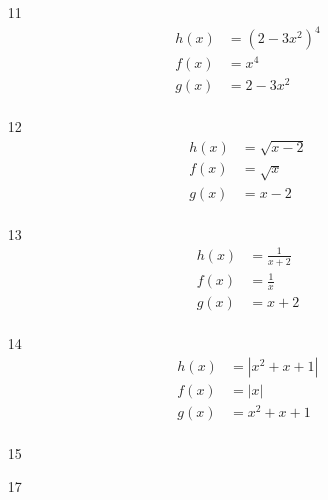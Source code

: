 \documentclass[fleqn,addpoints]{exam}
\begin{document}
\begin{itemize}
\item[11]
\begin{align*}
  h(x) &= (2-3x^2)^4 \\
  f(x) &= x^4 \\
  g(x) &= 2-3x^2 \\
\end{align*}

\item[12]
\begin{align*}
  h(x) &= \sqrt{x-2} \\
  f(x) &= \sqrt{x} \\
  g(x) &= x-2 \\
\end{align*}

\item[13]
\begin{align*}
  h(x) &=  \frac{1}{x+2}\\
  f(x) &=  \frac{1}{x}\\
  g(x) &= x+2 \\
\end{align*}

\item[14]
\begin{align*}
  h(x) &=  |x^2+x+1|\\
  f(x) &=  |x|\\
  g(x) &= x^2+x+1\\
\end{align*}

\item[15]

\item[17]


\end{itemize}
\end{document}
